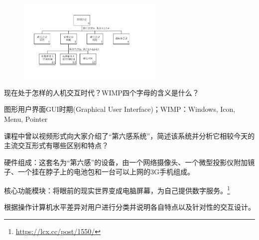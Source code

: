 \begin{solution}
\begin{figure}[H]
    \vspace{-0.5em}
	\centering
	\includegraphics[width=0.63\textwidth]{3.pdf}
    \vspace{-1em}
\end{figure}
\end{solution}



\begin{problem}[2016]
现在处于怎样的人机交互时代？WIMP四个字母的含义是什么？
\end{problem}

\begin{solution}
图形用户界面GUI时期(Graphical User Interface)；WIMP：Windows, Icon, Menu, Pointer
\end{solution}



\begin{problem}[2016、2021]
课程中曾以视频形式向大家介绍了“第六感系统”，简述该系统并分析它相较今天的主流交互形式有哪些区别和特点？
\end{problem}

\begin{solution}
硬件组成：这套名为“第六感”的设备，由一个网络摄像头、一个微型投影仪附加镜子、一个挂在脖子上的电池包和一台可以上网的3G手机组成。

核心功能模块：将眼前的现实世界变成电脑屏幕，为自己提供数字服务。\footnote{\url{https://lcx.cc/post/1550/}}
\end{solution}



\begin{problem}[2016]
根据操作计算机水平差异对用户进行分类并说明各自特点以及针对性的交互设计。
\end{problem}

\begin{solution}
\begin{table}[H]
\centering
{}
\end{table}
\end{solution}




